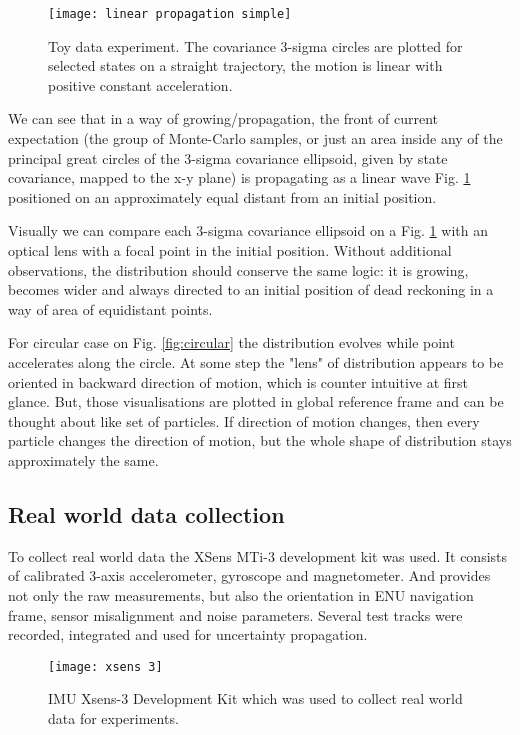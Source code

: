 \documentclass{article}
\begin{document}
\begin{figure}
	\texttt{[image: linear propagation simple]}
	
	\caption{Toy data experiment. The covariance 3-sigma circles are plotted for selected states on a straight trajectory, the motion is linear with positive constant acceleration.}
	\label{fig:linear-propagation-simple}
\end{figure}

We can see that in a way of growing/propagation, the front of current expectation (the group of Monte-Carlo samples, or just an area inside any of the principal great circles of the 3-sigma covariance ellipsoid, given by state covariance, mapped to the x-y plane) is propagating as a linear wave Fig. \ref{fig:linear-propagation-simple} positioned on an approximately equal distant from an initial position. 

Visually we can compare each 3-sigma covariance ellipsoid on a Fig. \ref{fig:linear-propagation-simple} with an optical lens with a focal point in the initial position. Without additional observations, the distribution should conserve the same logic: it is growing, becomes wider and always directed to an initial position of dead reckoning in a way of area of equidistant points. 


For circular case on Fig. \ref{fig:circular} the distribution evolves while point accelerates along the circle. At some step the "lens" of distribution appears to be oriented in backward direction of motion, which is counter intuitive at first glance. But, those visualisations are plotted in global reference frame and can be thought about like set of particles. If direction of motion changes, then every particle changes the direction of motion, but the whole shape of distribution stays approximately the same.

\subsection{Real world data collection}

To collect real world data the XSens MTi-3 development kit \cite{xsens} was used. It consists of calibrated 3-axis accelerometer, gyroscope and magnetometer. And provides not only the raw measurements, but also the orientation in ENU navigation frame, sensor misalignment and noise parameters. Several test tracks were recorded, integrated and used for uncertainty propagation.

\begin{figure}
	\centering
	\texttt{[image: xsens 3]}
	\caption{IMU Xsens-3 Development Kit which was used to collect real world data for experiments.}
	\label{fig:xsens}
\end{figure}
\end{document}
